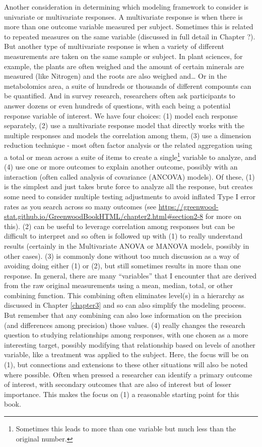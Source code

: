 \documentclass[
]{book}
\begin{document}
Another consideration in determining which modeling framework to consider is univariate or multivariate responses. A multivariate response is when there is more than one outcome variable measured per subject. Sometimes this is related to repeated measures on the same variable (discussed in full detail in Chapter ?). But another type of multivariate response is when a variety of different measurements are taken on the same sample or subject. In plant sciences, for example, the plants are often weighed and the amount of certain minerals are measured (like Nitrogen) and the roots are also weighed and\ldots{} Or in the metabolomics area, a suite of hundreds or thousands of different compounts can be quantified. And in survey research, researchers often ask participants to answer dozens or even hundreds of questions, with each being a potential response variable of interest. We have four choices: (1) model each response separately, (2) use a multivariate response model that directly works with the multiple responses and models the correlation among them, (3) use a dimension reduction technique - most often factor analysis or the related aggregation using a total or mean across a suite of items to create a single\footnote{Sometimes this leads to more than one variable but much less than the original number.} variable to analyze, and (4) use one or more outcomes to explain another outcome, possibly with an interaction (often called analysis of covariance (ANCOVA) models). Of these, (1) is the simplest and just takes brute force to analyze all the response, but creates some need to consider multiple testing adjustments to avoid inflated Type I error rates as you search across so many outcomes (see \url{https://greenwood-stat.github.io/GreenwoodBookHTML/chapter2.html\#section2-8} for more on this). (2) can be useful to leverage correlation among responses but can be difficult to interpret and so often is followed up with (1) to really understand results (certainly in the Multivariate ANOVA or MANOVA models, possibly in other cases). (3) is commonly done without too much discussion as a way of avoiding doing either (1) or (2), but still sometimes results in more than one response. In general, there are many ``variables'' that I encounter that are derived from the raw original measurements using a mean, median, total, or other combining function. This combining often eliminates level(s) in a hierarchy as discussed in Chapter \ref{chapter3} and so can also simplify the modeling process. But remember that any combining can also lose information on the precision (and differences among precision) those values. (4) really changes the research question to studying relationships among responses, with one chosen as a more interesting target, possibly modifying that relationship based on levels of another variable, like a treatment was applied to the subject. Here, the focus will be on (1), but connections and extensions to these other situations will also be noted where possible. Often when pressed a researcher can identify a primary outcome of interest, with secondary outcomes that are also of interest but of lesser importance. This makes the focus on (1) a reasonable starting point for this book.
\end{document}
